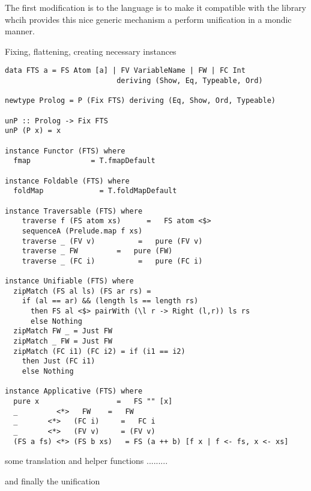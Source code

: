 \documentclass[thesis-solanki.tex]{subfiles}
\begin{document}
The first modification is to the language is to make it compatible with the library whcih provides this nice generic mechanism a perform 
unification in a mondic manner.

Fixing, flattening, creating necessary instances 
\begin{verbatim}
data FTS a = FS Atom [a] | FV VariableName | FW | FC Int 
                          deriving (Show, Eq, Typeable, Ord)

newtype Prolog = P (Fix FTS) deriving (Eq, Show, Ord, Typeable) 

unP :: Prolog -> Fix FTS
unP (P x) = x 

instance Functor (FTS) where
  fmap              = T.fmapDefault

instance Foldable (FTS) where
  foldMap             = T.foldMapDefault

instance Traversable (FTS) where
    traverse f (FS atom xs)      =   FS atom <$> 
    sequenceA (Prelude.map f xs)
    traverse _ (FV v)          =   pure (FV v)
    traverse _ FW         =   pure (FW)
    traverse _ (FC i)          =   pure (FC i)

instance Unifiable (FTS) where
  zipMatch (FS al ls) (FS ar rs) = 
    if (al == ar) && (length ls == length rs) 
      then FS al <$> pairWith (\l r -> Right (l,r)) ls rs     
      else Nothing
  zipMatch FW _ = Just FW
  zipMatch _ FW = Just FW
  zipMatch (FC i1) (FC i2) = if (i1 == i2) 
    then Just (FC i1) 
    else Nothing

instance Applicative (FTS) where
  pure x                  =   FS "" [x] 
  _         <*>   FW    =   FW
  _       <*>   (FC i)     =   FC i
  _       <*>   (FV v)     = (FV v)
  (FS a fs) <*> (FS b xs)   = FS (a ++ b) [f x | f <- fs, x <- xs]
\end{verbatim}

some translation and helper functions .........

and finally the unification
\end{document}
